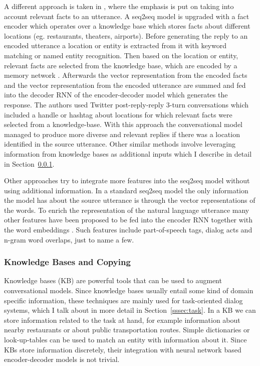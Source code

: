\documentclass[12pt]{article}
\begin{document}
A different approach is taken in \cite{Ghazvininejad:2017}, where the emphasis is put on taking into account relevant facts to an utterance. A seq2seq model is upgraded with a fact encoder which operates over a knowledge base which stores facts about different locations (eg. restaurants, theaters, airports). Before generating the reply to an encoded utterance a location or entity is extracted from it with keyword matching or named entity recognition. Then based on the location or entity, relevant facts are selected from the knowledge base, which are encoded by a memory network \cite{Sukhbaatar:2015}. Afterwards the vector representation from the encoded facts and the vector representation from the encoded utterance are summed and fed into the decoder RNN of the encoder-decoder model which generates the response. The authors used Twitter post-reply-reply 3-turn conversations which included a handle or hashtag about locations for which relevant facts were selected from a knowledge-base. With this approach the conversational model managed to produce more diverse and relevant replies if there was a location identified in the source utterance. Other similar methods involve leveraging information from knowledge bases as additional inputs which I describe in detail in Section~\ref{sssec:KB}. 

Other approaches try to integrate more features into the seq2seq model without using additional information. In a standard seq2seq model the only information the model has about the source utterance is through the vector representations of the words. To enrich the representation of the natural language utterance many other features have been proposed to be fed into the encoder RNN together with the word embeddings \cite{Sordoni:2015, Serban_MrRNN:2017,Serban:2017}. Such features include part-of-speech tags, dialog acts and n-gram word overlaps, just to name a few.

\subsubsection{Knowledge Bases and Copying} \label{sssec:KB}
Knowledge bases (KB) are powerful tools that can be used to augment conversational models. Since knowledge bases usually entail some kind of domain specific information, these techniques are mainly used for task-oriented dialog systems, which I talk about in more detail in Section~\ref{sssec:task}. In a KB we can store information related to the task at hand, for example information about nearby restaurants or about public transportation routes. Simple dictionaries or look-up-tables can be used to match an entity with information about it. Since KBs store information discretely, their integration with neural network based encoder-decoder models is not trivial.
\end{document}

